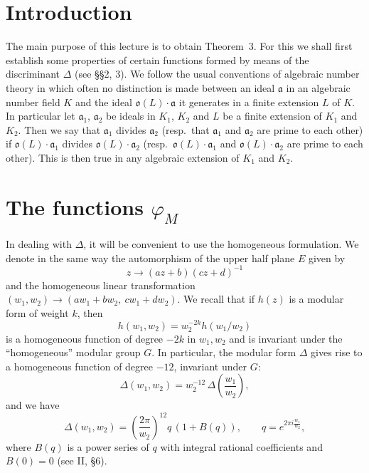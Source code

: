 
\setcounter{theorem}{0}
\setcounter{lemma}{0}

\section{Introduction}\label{sec:IV-intro}

The main purpose of this lecture is to obtain Theorem~3. For this we
shall first establish some properties of certain functions formed by
means of the discriminant $\Delta$ (see §§2, 3). We follow the usual
conventions of algebraic number theory in which often no distinction is
made between an ideal $\mathfrak{a}$ in an algebraic number field $K$ and
the ideal $\mathfrak{o}(L)\cdot\mathfrak{a}$ it generates in a finite
extension $L$ of $K$. In particular let $\mathfrak{a}_{1}$,
$\mathfrak{a}_{2}$ be ideals in $K_{1}$, $K_{2}$ and $L$ be a finite
extension of $K_{1}$ and $K_{2}$. Then we say that $\mathfrak{a}_{1}$
divides $\mathfrak{a}_{2}$ (resp.\ that $\mathfrak{a}_{1}$ and
$\mathfrak{a}_{2}$ are prime to each other) if
$\mathfrak{o}(L)\cdot\mathfrak{a}_{1}$ divides
$\mathfrak{o}(L)\cdot\mathfrak{a}_{2}$ (resp.\
$\mathfrak{o}(L)\cdot\mathfrak{a}_{1}$ and
$\mathfrak{o}(L)\cdot\mathfrak{a}_{2}$ are prime to each other). This is
then true in any algebraic extension of $K_{1}$ and $K_{2}$.

\section{\texorpdfstring{The functions $\varphi_{M}$}{The functions varphi\_M}}\label{sec:IV-varphiM}

In dealing with $\Delta$, it will be convenient to use the homogeneous
formulation. We denote in the same way the automorphism of the upper half
plane $E$ given by
\[
z\longrightarrow(az+b)(cz+d)^{-1}
\]
and the homogeneous linear transformation
$(w_{1},w_{2})\longrightarrow(aw_{1}+bw_{2},\ cw_{1}+dw_{2})$. We recall
that if $h(z)$ is a modular form of weight $k$, then
\[
h(w_{1},w_{2})=w_{2}^{-2k}h(w_{1}/w_{2})
\]
is a homogeneous function of degree $-2k$ in $w_{1},w_{2}$ and is
invariant under the ``homogeneous'' modular group $G$. In particular, the
modular form $\Delta$ gives rise to a homogeneous function of degree
$-12$, invariant under $G$:
\[
\Delta(w_{1},w_{2})=w_{2}^{-12}\,\Delta\!\left(\frac{w_{1}}{w_{2}}\right),
\]
and we have
\[
\Delta(w_{1},w_{2})=\left(\frac{2\pi}{w_{2}}\right)^{12}
q\,(1+B(q)),\qquad q=e^{2\pi i\frac{w_{1}}{w_{2}}},
\tag{1}\label{eq:IV-1}
\]
where $B(q)$ is a power series of $q$ with integral rational coefficients
and $B(0)=0$ (see II, §6).

